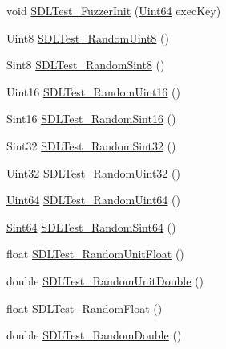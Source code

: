 \begin{DoxyCompactItemize}
\item 
void \hyperlink{x86__64-w64-mingw32_2include_2SDL2_2SDL__test__fuzzer_8h_a623db129ea615326bed457ebb9703c1e}{S\+D\+L\+Test\+\_\+\+Fuzzer\+Init} (\hyperlink{structUint64}{Uint64} exec\+Key)
\item 
Uint8 \hyperlink{x86__64-w64-mingw32_2include_2SDL2_2SDL__test__fuzzer_8h_af942b620c7418ec3d47a0610b94e8337}{S\+D\+L\+Test\+\_\+\+Random\+Uint8} ()
\item 
Sint8 \hyperlink{x86__64-w64-mingw32_2include_2SDL2_2SDL__test__fuzzer_8h_acf54a1586a83ad3f4873e0111d0202e7}{S\+D\+L\+Test\+\_\+\+Random\+Sint8} ()
\item 
Uint16 \hyperlink{x86__64-w64-mingw32_2include_2SDL2_2SDL__test__fuzzer_8h_a98beae757a943595d32aafee88cc4da1}{S\+D\+L\+Test\+\_\+\+Random\+Uint16} ()
\item 
Sint16 \hyperlink{x86__64-w64-mingw32_2include_2SDL2_2SDL__test__fuzzer_8h_ae1be2df94dde429c7fe936e2a4efea39}{S\+D\+L\+Test\+\_\+\+Random\+Sint16} ()
\item 
Sint32 \hyperlink{x86__64-w64-mingw32_2include_2SDL2_2SDL__test__fuzzer_8h_ac67535fd617b059fccc8ddb52e34aed0}{S\+D\+L\+Test\+\_\+\+Random\+Sint32} ()
\item 
Uint32 \hyperlink{x86__64-w64-mingw32_2include_2SDL2_2SDL__test__fuzzer_8h_a815bd0547ea1c3bed6a60ae4e96cd597}{S\+D\+L\+Test\+\_\+\+Random\+Uint32} ()
\item 
\hyperlink{structUint64}{Uint64} \hyperlink{x86__64-w64-mingw32_2include_2SDL2_2SDL__test__fuzzer_8h_a5d08f09338fb5f8e4b67a5d7e67231fd}{S\+D\+L\+Test\+\_\+\+Random\+Uint64} ()
\item 
\hyperlink{structUint64}{Sint64} \hyperlink{x86__64-w64-mingw32_2include_2SDL2_2SDL__test__fuzzer_8h_ae7e7c4c94ce61cc6f8fe6bc976662de0}{S\+D\+L\+Test\+\_\+\+Random\+Sint64} ()
\item 
float \hyperlink{x86__64-w64-mingw32_2include_2SDL2_2SDL__test__fuzzer_8h_a185df1c7d2cf7af44119bc9b87310b29}{S\+D\+L\+Test\+\_\+\+Random\+Unit\+Float} ()
\item 
double \hyperlink{x86__64-w64-mingw32_2include_2SDL2_2SDL__test__fuzzer_8h_af48d4a95e2f80651b8c7200fb4d0b671}{S\+D\+L\+Test\+\_\+\+Random\+Unit\+Double} ()
\item 
float \hyperlink{x86__64-w64-mingw32_2include_2SDL2_2SDL__test__fuzzer_8h_ac67cbb94c2868d3ee7aaeddc5c01705f}{S\+D\+L\+Test\+\_\+\+Random\+Float} ()
\item 
double \hyperlink{x86__64-w64-mingw32_2include_2SDL2_2SDL__test__fuzzer_8h_ac6f2dff59dec57742c4fe1ed47aaac8f}{S\+D\+L\+Test\+\_\+\+Random\+Double} ()

\end{DoxyCompactItemize}
